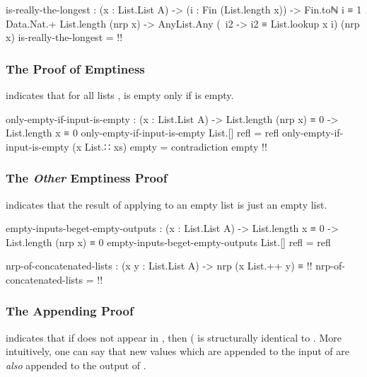 \documentclass{report}
\begin{document}
\begin{code}
  is-really-the-longest :
    (x : List.List A) ->
    (i : Fin (List.length x)) ->
    Fin.toℕ i ≡ 1 Data.Nat.+ List.length (nrp x) ->
    AnyList.Any (\ i2 -> i2 ≡ List.lookup x i) (nrp x)
  is-really-the-longest = {!!}
\end{code}

\subsubsection{The Proof of Emptiness}
 indicates that for all lists ,   is empty only if  is empty.

\begin{code}
  only-empty-if-input-is-empty :
    (x : List.List A) ->
    List.length (nrp x) ≡ 0 ->
    List.length x ≡ 0
  only-empty-if-input-is-empty List.[] refl = refl
  only-empty-if-input-is-empty (x List.∷ xs) empty = contradiction empty {!!}
\end{code}

\subsubsection{The \emph{Other} Emptiness Proof}
 indicates that the result of applying  to an empty list is just an empty list.

\begin{code}
  empty-inputs-beget-empty-outputs :
    (x : List.List A) ->
    List.length x ≡ 0 ->
    List.length (nrp x) ≡ 0
  empty-inputs-beget-empty-outputs List.[] refl = refl
\end{code}

\begin{code}
  nrp-of-concatenated-lists :
    (x y : List.List A) ->
    nrp (x List.++ y) ≡ {!!}
  nrp-of-concatenated-lists = {!!}
\end{code}

\subsubsection{The Appending Proof}
 indicates that if  does not appear in , then  \AgdaSymbol(  \AgdaOperator{\AgdaFunction{List.[}}  \AgdaOperator{\AgdaFunction{]}} is structurally identical to    \AgdaOperator{\AgdaFunction{List.[}}  \AgdaOperator{\AgdaFunction{]}}.  More intuitively, one can say that new values which are appended to the input of  are \emph{also} appended to the output of .
\end{document}
